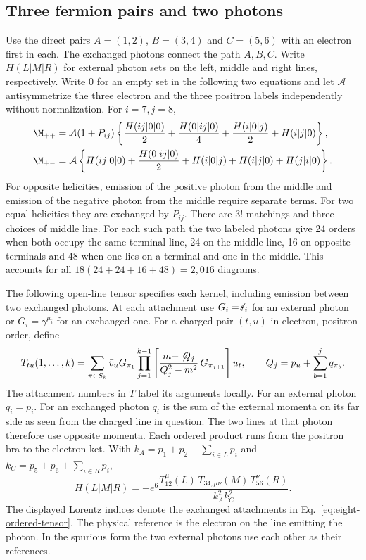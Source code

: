 \subsection{Three fermion pairs and two photons}\label{sec:eight-three-pairs}

Use the direct pairs $A=(1,2)$, $B=(3,4)$ and $C=(5,6)$ with an
electron first in each. The exchanged photons connect the path $A,B,C$.
Write $H(L|M|R)$ for external photon sets on the left, middle and right
lines, respectively. Write $0$ for an empty set in the following two
equations and let $\mathcal A$ antisymmetrize the three electron and the
three positron labels independently without normalization. For $i=7,j=8$,
\begin{align}
 \M_{++} &=\mathcal A(1+P_{ij})\left\{
 \frac{H(ij|0|0)}2+\frac{H(0|ij|0)}4
 +\frac{H(i|0|j)}2+H(i|j|0)\right\},\nonumber\\
 \M_{+-} &=\mathcal A\left\{
 H(ij|0|0)+\frac{H(0|ij|0)}2+H(i|0|j)
 +H(i|j|0)+H(j|i|0)\right\}.
 \label{eq:eight-six-fermions}
\end{align}
For opposite helicities, emission of the positive photon from the middle
and emission of the negative photon from the middle require separate terms.
For two equal helicities they are exchanged by $P_{ij}$. There are
$3!$ matchings and three choices of middle line. For each such path the
two labeled photons give 24 orders when both occupy the same terminal
line, 24 on the middle line, 16 on opposite terminals and 48 when one
lies on a terminal and one in the middle. This accounts for all
$18(24+24+16+48)=2{,}016$ diagrams.

The following open-line tensor specifies each kernel, including emission
between two exchanged photons. At each attachment use $G_i=\not\!\varepsilon_i$
for an external photon or $G_i=\gamma^{\mu_i}$ for an exchanged one.
For a charged pair $(t,u)$ in electron, positron order, define
\begin{equation}
 T_{tu}(1,\ldots,k)=\sum_{\pi\in S_k}
 \bar v_u G_{\pi_1}
 \prod_{j=1}^{k-1}
 \left[\frac{m-\not\! Q_j}{Q_j^2-m^2}\,G_{\pi_{j+1}}\right]u_t,
 \qquad Q_j=p_u+\sum_{b=1}^{j}q_{\pi_b}.
 \label{eq:eight-ordered-tensor}
\end{equation}
The attachment numbers in $T$ label its arguments locally. For an external
photon $q_i=p_i$. For an exchanged photon $q_i$ is the sum of the external
momenta on its far side as seen from the charged line in question. The two
lines at that photon therefore use opposite momenta. Each ordered product
runs from the positron bra to the electron ket. With
$k_A=p_1+p_2+\sum_{i\in L}p_i$ and $k_C=p_5+p_6+\sum_{i\in R}p_i$,
\begin{equation}
 H(L|M|R)=-e^6\frac{
 T_{12}^{\mu}(L)\,T_{34,\mu\nu}(M)\,T_{56}^{\nu}(R)}
 {k_A^2 k_C^2}.
 \label{eq:eight-six-kernel}
\end{equation}
The displayed Lorentz indices denote the exchanged attachments in
Eq.~\eqref{eq:eight-ordered-tensor}. The physical reference is the
electron on the line emitting the photon. In the spurious form the two
external photons use each other as their references.


